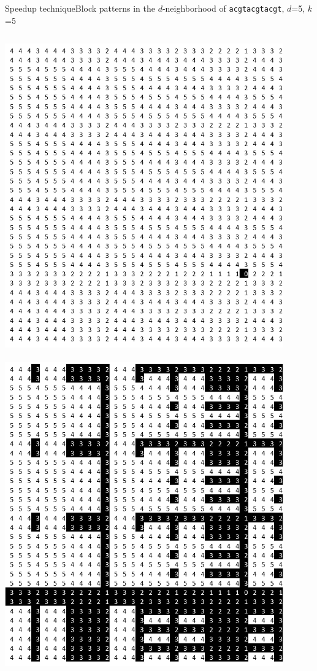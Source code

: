 \documentclass[pdf,xcolor={dvipsnames}]{beamer}
\begin{document}
	\begin{frame}{Speedup technique}{Block patterns in the $d$-neighborhood of \texttt{acgtacgtacgt}, $d$=5, $k$=5}
		\begin{columns}
			\begin{column}{0.33\textwidth}
				\includegraphics[width=0.9\textwidth]{img/0.png}\\\ \\
				\includegraphics[width=0.9\textwidth]{img/3.png}

\end{column}
\end{columns}
\end{frame}
\end{document}
